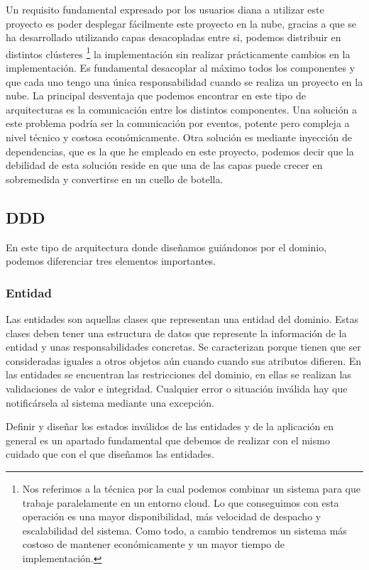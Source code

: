 Un requisito fundamental expresado por los usuarios diana a utilizar este proyecto es poder desplegar fácilmente este proyecto en la nube, gracias a que se ha desarrollado utilizando capas desacopladas entre si, podemos distribuir en distintos clústeres \footnote{Nos referimos a la técnica por la cual podemos combinar un sistema para que trabaje paralelamente en un entorno cloud. Lo que conseguimos con esta operación es una mayor disponibilidad, más velocidad de despacho y escalabilidad del sistema. Como todo, a cambio tendremos un sistema más costoso de mantener económicamente y un mayor tiempo de implementación. } la implementación sin realizar prácticamente cambios en la implementación.  Es fundamental desacoplar al máximo todos los componentes y que cada uno tengo una única responsabilidad cuando se realiza un proyecto en la nube. La principal desventaja que podemos encontrar en este tipo de arquitecturas es la comunicación entre los distintos componentes.  Una solución a este problema podría ser la comunicación por eventos, potente pero compleja a nivel técnico y costosa económicamente. Otra solución es mediante inyección de dependencias, que es la que he empleado en este proyecto, podemos decir que la debilidad de esta solución reside en que una de las capas puede crecer en sobremedida y convertirse en un cuello de botella.



\subsection{DDD}
En este tipo de arquitectura donde diseñamos guiándonos por el dominio, podemos diferenciar tres elementos importantes.

\subsubsection{Entidad}
Las entidades son aquellas clases que representan una entidad del dominio. Estas clases deben tener una estructura de datos que represente la información de la entidad y unas responsabilidades concretas. Se caracterizan porque tienen que ser consideradas iguales a otros objetos aún cuando cuando sus atributos difieren. En las entidades se encuentran las restricciones del dominio, en ellas se realizan las validaciones de valor e integridad. Cualquier error o situación inválida hay que notificársela al sistema mediante una excepción. 

Definir y diseñar los estados inválidos de las entidades y de la aplicación en general es un apartado fundamental que debemos de realizar con el mismo cuidado que con el que diseñamos las entidades.

